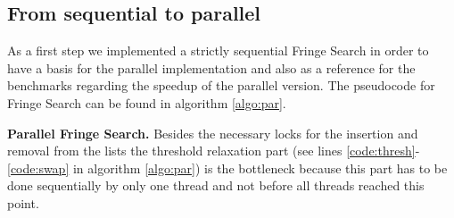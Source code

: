 \documentclass[letterpaper]{article}
\newcommand{\mypar}[1]{{\bf #1.}}
\begin{document}
\subsection{From sequential to parallel}\label{ssec:seqpar}

As a first step we implemented a strictly sequential Fringe Search in order to have a basis for the parallel implementation and also as a reference for the benchmarks regarding the speedup of the parallel version. The pseudocode for Fringe Search can be found in algorithm \ref{algo:par}.

\mypar{Parallel Fringe Search}
Besides the necessary locks for the insertion and removal from the lists the threshold relaxation part (see lines \ref{code:thresh}-\ref{code:swap} in algorithm \ref{algo:par}) is the bottleneck because this part has to be done sequentially by only one thread and not before all threads reached this point.
\end{document}

